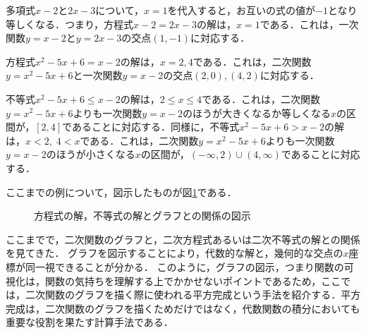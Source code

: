 \begin{example*}
	多項式$x-2$と$2x-3$について，$x = 1$を代入すると，お互いの式の値が$-1$となり等しくなる．つまり，方程式$x-2 = 2x-3$の解は，$x = 1$である\footnotemark[3]．これは，一次関数$y = x-2$と$y = 2x-3$の交点$(1, -1)$に対応する．
\end{example*}
\begin{example*}
	方程式$x^2-5x+6 = x-2$の解は，$x = 2, 4$である\footnotemark[3]．これは，二次関数$y = x^2-5x+6$と一次関数$y = x-2$の交点$(2, 0), (4, 2)$に対応する．
\end{example*}
\begin{example*}
	不等式$x^2-5x+6 \leq x-2$の解は，$2 \leq x \leq 4$である．これは，二次関数$y = x^2-5x+6$よりも一次関数$y = x-2$のほうが大きくなるか等しくなる$x$の区間が，$\left[2, 4\right]$であることに対応する．同様に，不等式$x^2-5x+6 > x-2$の解は，$x < 2,\; 4 < x$である．これは，二次関数$y = x^2-5x+6$よりも一次関数$y = x-2$のほうが小さくなる$x$の区間が，$\left(-\infty, 2\right) \cup \left(4, \infty\right)$であることに対応する．
\end{example*}

ここまでの例について，図示したものが図\ref{fig:equation}である．

\vfill
\begin{figure}[!h]
	\caption{方程式の解，不等式の解とグラフとの関係の図示}
	\label{fig:equation}
\end{figure}
\clearpage

ここまでで，二次関数のグラフと，二次方程式あるいは二次不等式の解との関係を見てきた．
グラフを図示することにより，代数的な解と，幾何的な交点の$x$座標が同一視できることが分かる．
このように，グラフの図示，つまり関数の可視化は，関数の気持ちを理解する上でかかせないポイントであるため，ここでは，二次関数のグラフを描く際に使われる平方完成という手法を紹介する．平方完成は，二次関数のグラフを描くためだけではなく，代数関数の積分においても重要な役割を果たす計算手法である．

